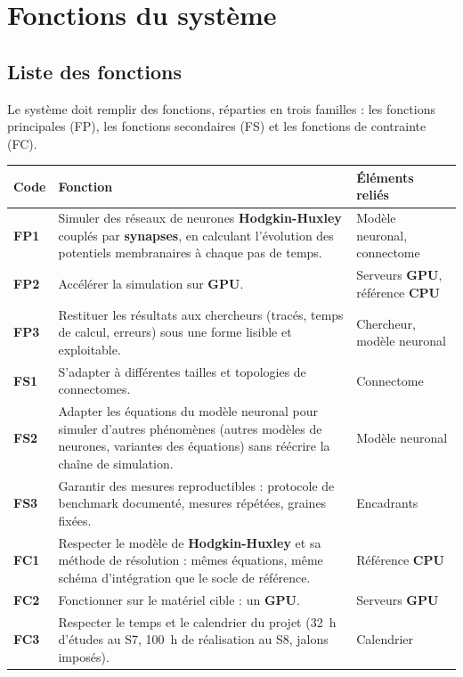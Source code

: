 \documentclass{report}
\begin{document}
\chapter{Fonctions du système}

\section{Liste des fonctions}

Le système doit remplir des fonctions, réparties en trois familles : les fonctions principales (FP), les fonctions secondaires (FS) et les fonctions de contrainte (FC). 

{\small
\begin{longtable}{|p{0.9cm}|p{8.6cm}|p{2.7cm}|}
\hline
\rowcolor{gray!15} \textbf{Code} & \textbf{Fonction} & \textbf{Éléments reliés} \\ \hline
\endhead
\rowcolor{whybg} \textbf{FP1} & Simuler des réseaux de neurones \textbf{Hodgkin-Huxley} couplés par \textbf{synapses}, en calculant l'évolution des potentiels membranaires à chaque pas de temps. & Modèle neuronal, connectome \\ \hline
\rowcolor{whybg} \textbf{FP2} & Accélérer la simulation sur \textbf{GPU}. & Serveurs \textbf{GPU}, référence \textbf{CPU} \\ \hline
\rowcolor{whybg} \textbf{FP3} & Restituer les résultats aux chercheurs (tracés, temps de calcul, erreurs) sous une forme lisible et exploitable. & Chercheur, modèle neuronal \\ \hline
\rowcolor{whatbg} \textbf{FS1} & S'adapter à différentes tailles et topologies de connectomes. & Connectome  \\ \hline
\rowcolor{whatbg} \textbf{FS2} & Adapter les équations du modèle neuronal pour simuler d'autres phénomènes (autres modèles de neurones, variantes des équations) sans réécrire la chaîne de simulation. & Modèle neuronal  \\ \hline
\rowcolor{whatbg} \textbf{FS3} & Garantir des mesures reproductibles : protocole de benchmark documenté, mesures répétées, graines fixées. & Encadrants  \\ \hline
\rowcolor{defibg} \textbf{FC1} & Respecter le modèle de \textbf{Hodgkin-Huxley} et sa méthode de résolution : mêmes équations, même schéma d'intégration que le socle de référence. & Référence \textbf{CPU} \\ \hline
\rowcolor{defibg} \textbf{FC2} & Fonctionner sur le matériel cible : un \textbf{GPU}. & Serveurs \textbf{GPU} \\ \hline
\rowcolor{defibg} \textbf{FC3} & Respecter le temps et le calendrier du projet (32~h d'études au S7, 100~h de réalisation au S8, jalons imposés). & Calendrier \\ \hline
\end{longtable}}
\end{document}

